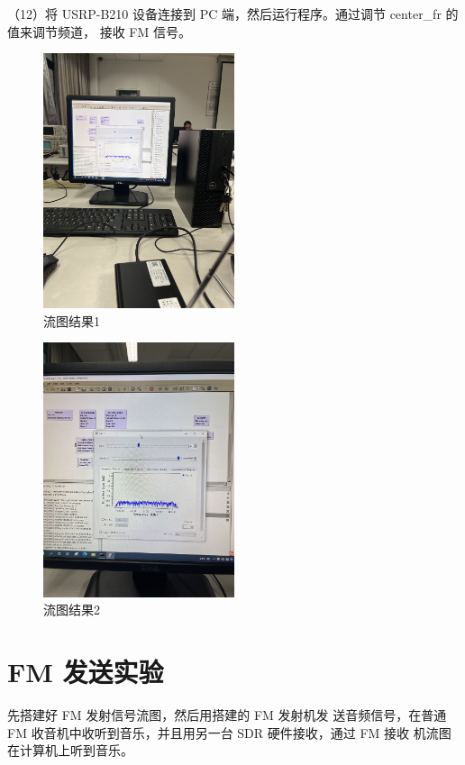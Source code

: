\documentclass{../source/Experiment}
\begin{document}
        （12）将 USRP-B210 设备连接到 PC 端，然后运行程序。通过调节 center\_fr 的值来调节频道， 接收 FM 信号。

        \begin{figure}[H]
            \centering
            \includegraphics[width = 0.5\textwidth,angle=270]{lab7/1.jpg}
            \caption{流图结果1}
        \end{figure}

        \begin{figure}[H]
            \centering
            \includegraphics[width = 0.5\textwidth,angle=270]{lab7/2.jpg}
            \caption{流图结果2}
        \end{figure}
    \section{FM 发送实验}
        先搭建好 FM 发射信号流图，然后用搭建的 FM 发射机发 送音频信号，在普通 FM 收音机中收听到音乐，并且用另一台 SDR 硬件接收，通过 FM 接收 机流图在计算机上听到音乐。
\end{document}
